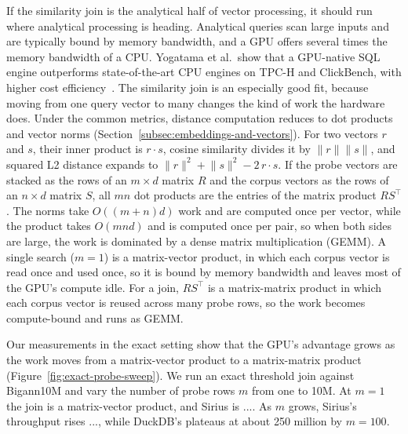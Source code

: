 If the similarity join is the analytical half of vector processing, it should run where analytical processing is heading.
Analytical queries scan large inputs and are typically bound by memory bandwidth, and a GPU offers several times the memory bandwidth of a CPU\@.
Yogatama et al.\ show that a GPU-native SQL engine outperforms state-of-the-art CPU engines on TPC-H and ClickBench, with higher cost efficiency~\cite{Yogatama26, SiriusClickBench25}.
The similarity join is an especially good fit, because moving from one query vector to many changes the kind of work the hardware does.
Under the common metrics, distance computation reduces to dot products and vector norms (Section~\ref{subsec:embeddings-and-vectors}).
For two vectors $r$ and $s$, their inner product is $r \cdot s$, cosine similarity divides it by $\lVert r \rVert \lVert s \rVert$, and squared L2 distance expands to $\lVert r \rVert^2 + \lVert s \rVert^2 - 2\, r \cdot s$.
If the probe vectors are stacked as the rows of an $m \times d$ matrix $R$ and the corpus vectors as the rows of an $n \times d$ matrix $S$, all $mn$ dot products are the entries of the matrix product $RS^\top$.
The norms take $O((m+n)d)$ work and are computed once per vector, while the product takes $O(mnd)$ and is computed once per pair, so when both sides are large, the work is dominated by a dense matrix multiplication (GEMM).
A single search ($m=1$) is a matrix-vector product, in which each corpus vector is read once and used once, so it is bound by memory bandwidth and leaves most of the GPU's compute idle.
For a join, $RS^\top$ is a matrix-matrix product in which each corpus vector is reused across many probe rows, so the work becomes compute-bound and runs as GEMM.



Our measurements in the exact setting show that the GPU's advantage grows as the work moves from a matrix-vector product to a matrix-matrix product (Figure~\ref{fig:exact-probe-sweep}).
We run an exact threshold join against Bigann10M and vary the number of probe rows $m$ from one to 10M\@.
At $m=1$ the join is a matrix-vector product, and Sirius is ....
As $m$ grows, Sirius's throughput rises ..., while DuckDB's plateaus at about 250 million by $m=100$.
